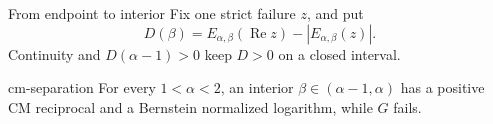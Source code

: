 \documentclass{beamer}
\begin{document}
\begin{frame}{From endpoint to interior}
Fix one strict failure $z$, and put
\[
D(\beta)=E_{\alpha,\beta}(\operatorname{Re}z)-|E_{\alpha,\beta}(z)|.
\]
Continuity and $D(\alpha-1)>0$ keep $D>0$ on a closed interval.
\begin{bookresult}{cm-separation}
For every $1{<} \alpha{<} 2$, an interior $\beta\in(\alpha-1,\alpha)$ has a positive CM reciprocal and a Bernstein normalized logarithm, while $G$ fails.
\end{bookresult}
\end{frame}
\end{document}

